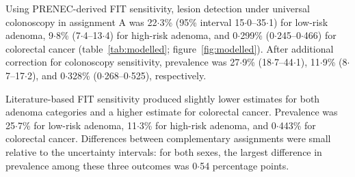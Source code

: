 \documentclass[10pt,a4paper]{article}
\newcommand{\dec}{\ensuremath{\cdot}}
\begin{document}
Using PRENEC-derived FIT sensitivity, lesion detection under universal
colonoscopy in assignment A was 22\dec{}3\% (95\% interval
15\dec{}0--35\dec{}1) for low-risk adenoma, 9\dec{}8\%
(7\dec{}4--13\dec{}4) for high-risk adenoma, and 0\dec{}299\%
(0\dec{}245--0\dec{}466) for colorectal cancer
(table~\ref{tab:modelled}; figure~\ref{fig:modelled}). After additional
correction for colonoscopy sensitivity, prevalence was 27\dec{}9\%
(18\dec{}7--44\dec{}1), 11\dec{}9\% (8\dec{}7--17\dec{}2), and
0\dec{}328\% (0\dec{}268--0\dec{}525), respectively.

Literature-based FIT sensitivity produced slightly lower estimates for both
adenoma categories and a higher estimate for colorectal cancer. Prevalence was
25\dec{}7\% for low-risk adenoma, 11\dec{}3\% for high-risk adenoma, and
0\dec{}443\% for colorectal cancer. Differences between complementary
assignments were small relative to the uncertainty intervals: for both sexes,
the largest difference in prevalence among these three outcomes was
0\dec{}54 percentage points.
\end{document}
